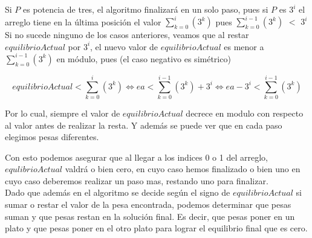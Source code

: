 Si $P$ es potencia de tres, el algoritmo finalizará en un solo paso, pues si $P$ es $3^i$ el arreglo tiene en la última posición el valor  $\sum_{k=0}^{i}(3^k)$ pues $\sum_{k=0}^{i-1}(3^k)$ $<$ $3^i$\\

Si no sucede ninguno de los casos anteriores, veamos que al restar $equilibrioActual$ por $3^{i}$, el nuevo valor de $equilibrioActual$ es menor a $\sum_{k=0}^{i-1}(3^k)$ en módulo, pues (el caso negativo es simétrico)

\begin{equation}
equilibrioActual < \sum_{k=0}^{i}(3^k) \iff
ea < \sum_{k=0}^{i-1}(3^k) + 3^{i} \iff
ea - 3^{i} < \sum_{k=0}^{i-1}(3^k) 
\end{equation}

Por lo cual, siempre el valor de $equilibrioActual$ decrece en modulo con respecto al valor antes de realizar la resta. Y además se puede ver que en cada paso elegimos pesas diferentes.

Con esto podemos asegurar que al llegar a los indices 0 o 1 del arreglo, $equlibrioActual$ valdrá o bien cero, en cuyo caso hemos finalizado o bien uno en cuyo caso deberemos realizar un paso mas, restando uno para finalizar.\\

Dado que además en el algoritmo se decide según el signo de $equilibrioActual$ si sumar o restar el valor de la pesa encontrada, podemos determinar que pesas suman y que pesas restan en la solución final. Es decir, que pesas poner en un plato y que pesas poner en el otro plato para lograr el equilibrio final que es cero.


